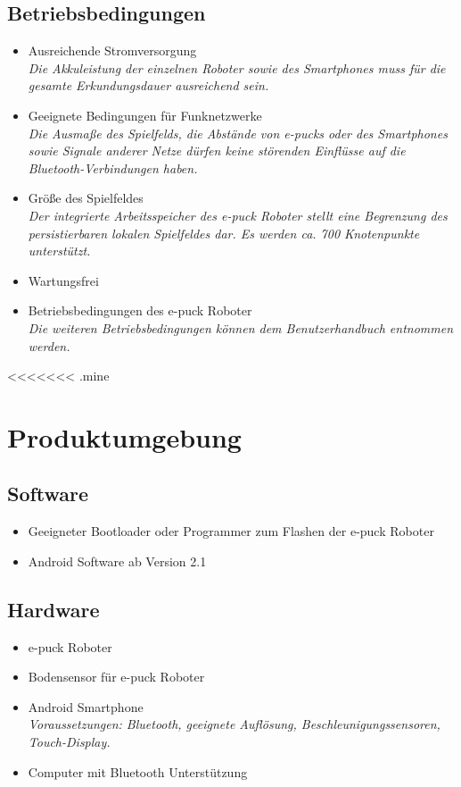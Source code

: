 \documentclass[10pt,a4paper]{article}
\begin{document}
		\subsection{Betriebsbedingungen}
			\begin{itemize}
				\item Ausreichende Stromversorgung
					\\ \textsl{ Die Akkuleistung der einzelnen Roboter sowie des Smartphones muss für die gesamte
						Erkundungsdauer ausreichend sein.}
				\item Geeignete Bedingungen für Funknetzwerke
					\\ \textsl{ Die Ausmaße des Spielfelds, die Abstände von e-pucks oder des Smartphones sowie
						Signale anderer Netze dürfen keine störenden Einflüsse auf die Bluetooth-Verbindungen haben.}
				\item Größe des Spielfeldes
					\\ \textsl{Der integrierte Arbeitsspeicher des e-puck Roboter stellt eine Begrenzung des 
					 persistierbaren lokalen Spielfeldes dar. Es werden ca. 700 Knotenpunkte unterstützt. }			
				\item Wartungsfrei
				\item Betriebsbedingungen des e-puck Roboter
					\\ \textsl{Die weiteren Betriebsbedingungen können dem Benutzerhandbuch 	entnommen werden.}
			\end{itemize}
<<<<<<< .mine
		\section{Produktumgebung}
			\subsection{Software}
				\begin{itemize}
					\item Geeigneter Bootloader oder Programmer zum Flashen der e-puck Roboter
					\item Android Software ab Version 2.1
				\end{itemize}
			\subsection{Hardware}
				\begin{itemize}
					\item e-puck Roboter
					\item Bodensensor für e-puck Roboter
					\item Android Smartphone
						\\ \textsl{Voraussetzungen: Bluetooth, geeignete Auflösung, Beschleunigungssensoren, Touch-Display.}
					\item Computer mit Bluetooth Unterstützung
				\end{itemize}		
\end{document}
